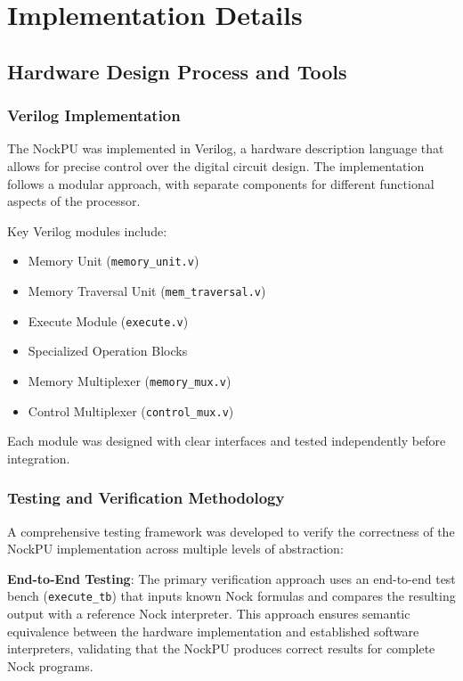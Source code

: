 \documentclass[twoside]{article}
\begin{document}
\section{Implementation Details}

\subsection{Hardware Design Process and Tools}

\subsubsection{Verilog Implementation}

The NockPU was implemented in Verilog, a hardware description language that allows for precise control over the digital circuit design. The implementation follows a modular approach, with separate components for different functional aspects of the processor.

Key Verilog modules include:
\begin{itemize}
  \item Memory Unit (\texttt{memory\_unit.v})
  \item Memory Traversal Unit (\texttt{mem\_traversal.v})
  \item Execute Module (\texttt{execute.v})
  \item Specialized Operation Blocks
  \item Memory Multiplexer (\texttt{memory\_mux.v})
  \item Control Multiplexer (\texttt{control\_mux.v})
\end{itemize}

\noindent
Each module was designed with clear interfaces and tested independently before integration.

\subsubsection{Testing and Verification Methodology}

A comprehensive testing framework was developed to verify the correctness of the NockPU implementation across multiple levels of abstraction:

\textbf{End-to-End Testing}: The primary verification approach uses an end-to-end test bench (\texttt{execute\_tb}) that inputs known Nock formulas and compares the resulting output with a reference Nock interpreter. This approach ensures semantic equivalence between the hardware implementation and established software interpreters, validating that the NockPU produces correct results for complete Nock programs.
\end{document}
